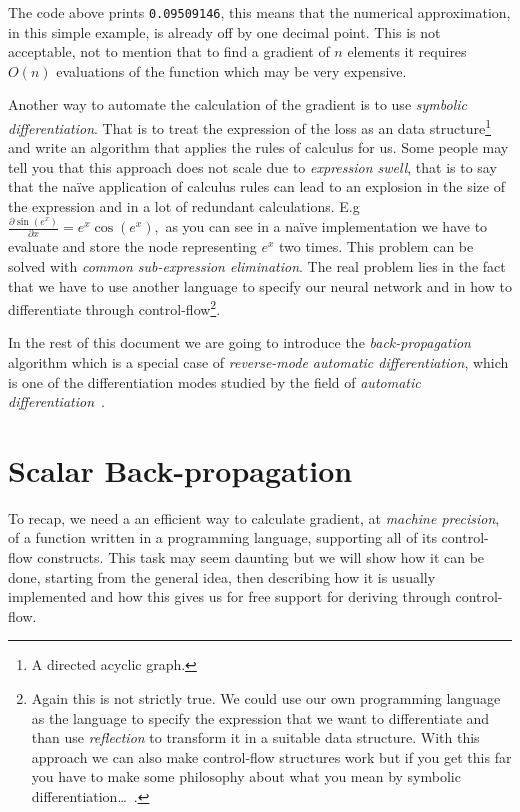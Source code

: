 \documentclass{article}
\newcommand{\partialfrac}[2]{\frac{\partial #1}{\partial #2}}
\begin{document}
The code above prints \texttt{0.09509146}, this means
that the numerical approximation, in this simple example, is already off by one
decimal point. This is not acceptable, not to mention that to find a gradient
of \(n\) elements it requires \(O(n)\) evaluations of the function which may be
very expensive.

Another way to automate the calculation of the gradient is to use
\emph{symbolic differentiation}. That is to treat the expression of the loss
as an data structure\footnote{A directed acyclic graph.} and write an algorithm
that applies the rules of calculus for us. Some people may tell you that this
approach does not scale due to \emph{expression swell}, that is to say that the
na\"ive application of calculus rules can lead to an explosion in the size of
the expression and in a lot of redundant calculations. E.g
\(\partialfrac{\sin(e^x)} x = e^x \cos(e^x),\) as you can see in a na\"ive
implementation we have to evaluate and store the node representing \(e^x\) two
times. This problem can be solved with \emph{common sub-expression
elimination}. The real problem lies in the fact that we have to use another
language to specify our neural network and in how to differentiate through
control-flow\footnote{Again this is not strictly true. We could use our own
programming language as the language to specify the expression that we want to
differentiate and than use \emph{reflection} to transform it in a suitable data
structure. With this approach we can also make control-flow structures work but
if you get this far you have to make some philosophy about what you mean by
symbolic differentiation\dots~\cite{equiv}.}.

In the rest of this document we are going to introduce the
\emph{back-propagation} algorithm which is a special case of \emph{reverse-mode
automatic differentiation}, which is one of the differentiation modes studied
by the field of \emph{automatic differentiation}~\cite{survey,griewank}.

\section{Scalar Back-propagation}

To recap, we need a an efficient way to calculate gradient, at \emph{machine
precision}, of a function written in a programming language, supporting all of
its control-flow constructs. This task may seem daunting but we will show how
it can be done, starting from the general idea, then describing how it is
usually implemented and how this gives us for free support for deriving through
control-flow.
\end{document}
